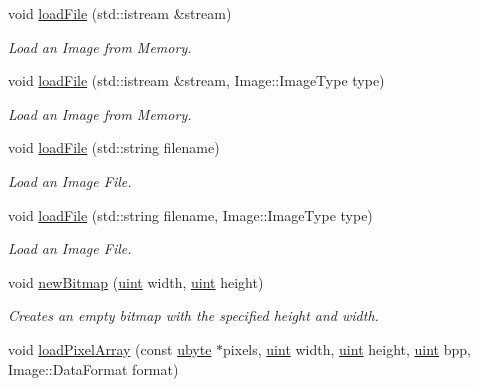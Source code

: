 \begin{DoxyCompactItemize}
void \hyperlink{class_f2_c_1_1_bitmap_a1b7095b2eea63245aad49929b2f7303c}{loadFile} (std::istream \&stream)
\begin{DoxyCompactList}\small\item\em Load an Image from Memory. \item\end{DoxyCompactList}\item 
void \hyperlink{class_f2_c_1_1_bitmap_a9e51707f78fa8e1732c0b082fff16c34}{loadFile} (std::istream \&stream, Image::ImageType type)
\begin{DoxyCompactList}\small\item\em Load an Image from Memory. \item\end{DoxyCompactList}\item 
void \hyperlink{class_f2_c_1_1_bitmap_a9f318b926d8175b19038aef999d24ce4}{loadFile} (std::string filename)
\begin{DoxyCompactList}\small\item\em Load an Image File. \item\end{DoxyCompactList}\item 
void \hyperlink{class_f2_c_1_1_bitmap_a7de46ee1b228de65b7ef22021ccff4d5}{loadFile} (std::string filename, Image::ImageType type)
\begin{DoxyCompactList}\small\item\em Load an Image File. \item\end{DoxyCompactList}\item 
void \hyperlink{class_f2_c_1_1_bitmap_aaec3a71bd846e0570c62d34bd2d4b80c}{newBitmap} (\hyperlink{namespace_f2_c_a58be2bac9eb3e3c99cb41b6008bf4fae}{uint} width, \hyperlink{namespace_f2_c_a58be2bac9eb3e3c99cb41b6008bf4fae}{uint} height)
\begin{DoxyCompactList}\small\item\em Creates an empty bitmap with the specified height and width. \item\end{DoxyCompactList}\item 
void \hyperlink{class_f2_c_1_1_bitmap_ad8854f706211292b72ee7ab29f50367f}{loadPixelArray} (const \hyperlink{namespace_f2_c_a74fad364688add30796d711e5635ac77}{ubyte} $\ast$pixels, \hyperlink{namespace_f2_c_a58be2bac9eb3e3c99cb41b6008bf4fae}{uint} width, \hyperlink{namespace_f2_c_a58be2bac9eb3e3c99cb41b6008bf4fae}{uint} height, \hyperlink{namespace_f2_c_a58be2bac9eb3e3c99cb41b6008bf4fae}{uint} bpp, Image::DataFormat format)

\end{DoxyCompactItemize}
